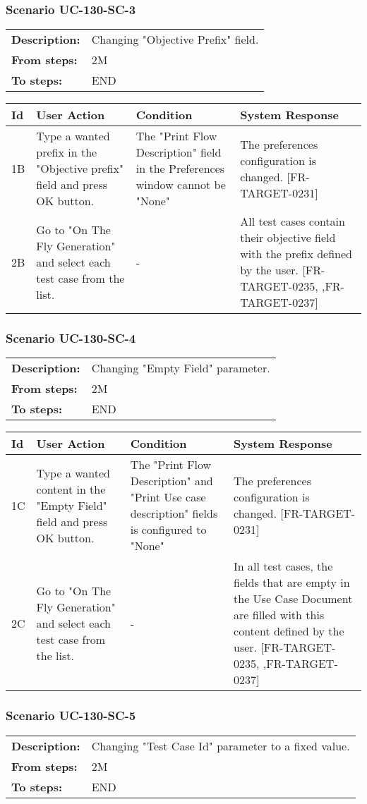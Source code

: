 \documentclass[a4paper,11pt]{article}
\newcommand{\bl}{\\ \hline}
\begin{document}
\subsubsection*{Scenario UC-130-SC-3}
\begin{tabular}{p{1in}p{4in}}
{\bf Description:} & Changing "Objective Prefix" field. \\
{\bf From steps:} & 2M \\
{\bf To steps:} & END \\
\end{tabular}
 
\begin{tabular}{|p{0.8in}|p{1.6in}|p{1.6in}|p{1.6in}|}
\hline
Id & User Action & Condition & System Response  \bl 
1B & Type a wanted prefix in the "Objective prefix" field and press OK button. & The "Print Flow Description" field in the Preferences window  cannot be "None" & The preferences configuration is changed. [FR-TARGET-0231] \bl 
2B & Go to "On The Fly Generation" and select each test case from the list. & - & All test cases contain their objective field with the prefix defined by the user. [FR-TARGET-0235, ,FR-TARGET-0237] \bl 
\end{tabular}
\subsubsection*{Scenario UC-130-SC-4}
\begin{tabular}{p{1in}p{4in}}
{\bf Description:} & Changing "Empty Field" parameter. \\
{\bf From steps:} & 2M \\
{\bf To steps:} & END \\
\end{tabular}
 
\begin{tabular}{|p{0.8in}|p{1.6in}|p{1.6in}|p{1.6in}|}
\hline
Id & User Action & Condition & System Response  \bl 
1C & Type a wanted content in the "Empty Field" field and press OK button. & The "Print Flow Description" and "Print Use case description" fields is configured to "None" & The preferences configuration is changed. [FR-TARGET-0231] \bl 
2C & Go to "On The Fly Generation" and select each test case from the list. & - & In all test cases, the fields that are empty in the Use Case Document are filled with this content defined by the user. [FR-TARGET-0235, ,FR-TARGET-0237] \bl 
\end{tabular}
\subsubsection*{Scenario UC-130-SC-5}
\begin{tabular}{p{1in}p{4in}}
{\bf Description:} & Changing "Test Case Id" parameter to a fixed value. \\
{\bf From steps:} & 2M \\
{\bf To steps:} & END \\
\end{tabular}
 
\end{document}
